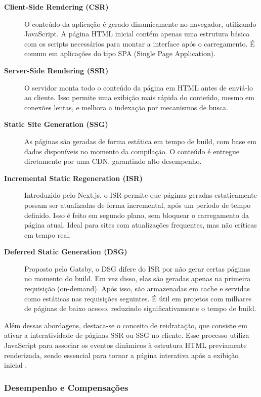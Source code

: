 \begin{description}
  \item[\textbf{Client-Side Rendering (CSR)}] 
  O conteúdo da aplicação é gerado dinamicamente no navegador, utilizando JavaScript. A página HTML inicial contém apenas uma estrutura básica com os scripts necessários para montar a interface após o carregamento. É comum em aplicações do tipo SPA (Single Page Application).
  
  \item[\textbf{Server-Side Rendering (SSR)}]
  O servidor monta todo o conteúdo da página em HTML antes de enviá-lo ao cliente. Isso permite uma exibição mais rápida do conteúdo, mesmo em conexões lentas, e melhora a indexação por mecanismos de busca.

  \item[\textbf{Static Site Generation (SSG)}]
  As páginas são geradas de forma estática em tempo de build, com base em dados disponíveis no momento da compilação. O conteúdo é entregue diretamente por uma CDN, garantindo alto desempenho.

  \item[\textbf{Incremental Static Regeneration (ISR)}]
  Introduzido pelo Next.js, o ISR permite que páginas geradas estaticamente possam ser atualizadas de forma incremental, após um período de tempo definido. Isso é feito em segundo plano, sem bloquear o carregamento da página atual. Ideal para sites com atualizações frequentes, mas não críticas em tempo real.

  \item[\textbf{Deferred Static Generation (DSG)}]
  Proposto pelo Gatsby, o DSG difere do ISR por não gerar certas páginas no momento do build. Em vez disso, elas são geradas apenas na primeira requisição (on-demand). Após isso, são armazenadas em cache e servidas como estáticas nas requisições seguintes. É útil em projetos com milhares de páginas de baixo acesso, reduzindo significativamente o tempo de build.
\end{description}

Além dessas abordagens, destaca-se o conceito de reidratação, que consiste em ativar a interatividade de páginas SSR ou SSG no cliente. Esse processo utiliza JavaScript para associar os eventos dinâmicos à estrutura HTML previamente renderizada, sendo essencial para tornar a página interativa após a exibição inicial \cite{osmani2025}.


\subsubsection{Desempenho e Compensações}

